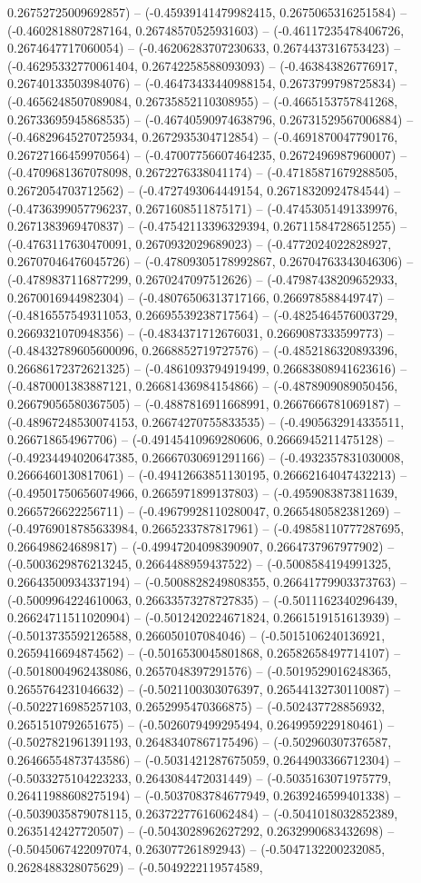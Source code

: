 0.26752725009692857) -- (-0.45939141479982415, 0.2675065316251584) -- (-0.4602818807287164, 0.26748570525931603) -- (-0.46117235478406726, 0.2674647717060054) -- (-0.46206283707230633, 0.2674437316753423) -- (-0.46295332770061404, 0.26742258588093093) -- (-0.463843826776917, 0.26740133503984076) -- (-0.46473433440988154, 0.2673799798725834) -- (-0.4656248507089084, 0.26735852110308955) -- (-0.4665153757841268, 0.26733695945868535) -- (-0.46740590974638796, 0.26731529567006884) -- (-0.46829645270725934, 0.2672935304712854) -- (-0.4691870047790176, 0.26727166459970564) -- (-0.47007756607464235, 0.2672496987960007) -- (-0.4709681367078098, 0.2672276338041174) -- (-0.47185871679288505, 0.2672054703712562) -- (-0.4727493064449154, 0.26718320924784544) -- (-0.4736399057796237, 0.2671608511875171) -- (-0.47453051491339976, 0.2671383969470837) -- (-0.47542113396329394, 0.26711584728651255) -- (-0.4763117630470091, 0.2670932029689023) -- (-0.4772024022828927, 0.26707046476045726) -- (-0.47809305178992867, 0.26704763343046306) -- (-0.4789837116877299, 0.2670247097512626) -- (-0.47987438209652933, 0.2670016944982304) -- (-0.48076506313717166, 0.266978588449747) -- (-0.4816557549311053, 0.26695539238717564) -- (-0.4825464576003729, 0.2669321070948356) -- (-0.4834371712676031, 0.2669087333599773) -- (-0.48432789605600096, 0.2668852719727576) -- (-0.4852186320893396, 0.26686172372621325) -- (-0.4861093794919499, 0.26683808941623616) -- (-0.4870001383887121, 0.26681436984154866) -- (-0.4878909089050456, 0.26679056580367505) -- (-0.4887816911668991, 0.2667666781069187) -- (-0.48967248530074153, 0.26674270755833535) -- (-0.4905632914335511, 0.266718654967706) -- (-0.49145410969280606, 0.2666945211475128) -- (-0.49234494020647385, 0.26667030691291166) -- (-0.4932357831030008, 0.2666460130817061) -- (-0.49412663851130195, 0.26662164047432213) -- (-0.49501750656074966, 0.2665971899137803) -- (-0.4959083873811639, 0.2665726622256711) -- (-0.49679928110280047, 0.2665480582381269) -- (-0.49769018785633984, 0.2665233787817961) -- (-0.49858110777287695, 0.266498624689817) -- (-0.49947204098390907, 0.2664737967977902) -- (-0.5003629876213245, 0.2664488959437522) -- (-0.5008584194991325, 0.26643500934337194) -- (-0.5008828249808355, 0.26641779903373763) -- (-0.5009964224610063, 0.26633573278727835) -- (-0.5011162340296439, 0.26624711511020904) -- (-0.5012420224671824, 0.2661519151613939) -- (-0.5013735592126588, 0.266050107084046) -- (-0.5015106240136921, 0.2659416694874562) -- (-0.5016530045801868, 0.26582658497714107) -- (-0.5018004962438086, 0.2657048397291576) -- (-0.5019529016248365, 0.2655764231046632) -- (-0.5021100303076397, 0.26544132730110087) -- (-0.5022716985257103, 0.2652995470366875) -- (-0.502437728856932, 0.2651510792651675) -- (-0.5026079499295494, 0.2649959229180461) -- (-0.5027821961391193, 0.26483407867175496) -- (-0.502960307376587, 0.26466554873743586) -- (-0.5031421287675059, 0.2644903366712304) -- (-0.5033275104223233, 0.2643084472031449) -- (-0.5035163071975779, 0.26411988608275194) -- (-0.5037083784677949, 0.2639246599401338) -- (-0.5039035879078115, 0.26372277616062484) -- (-0.5041018032852389, 0.2635142427720507) -- (-0.5043028962627292, 0.2632990683432698) -- (-0.5045067422097074, 0.263077261892943) -- (-0.5047132200232085, 0.2628488328075629) -- (-0.5049222119574589, 